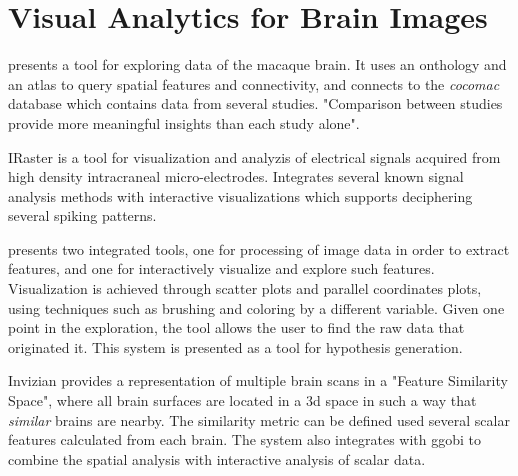 

\section{Visual Analytics for Brain Images}

\autocite{bezgin_matching_2009} presents a tool for exploring data of the macaque brain. It uses an onthology and an atlas to query spatial features and connectivity, and connects to the \emph{cocomac} database which contains data from several studies. "Comparison between studies provide more meaningful insights than each study alone".

IRaster \autocite{somerville_iraster:_2010}  is a tool for visualization and analyzis of electrical signals acquired from high density intracraneal micro-electrodes. Integrates several known signal analysis methods with interactive visualizations which supports deciphering several spiking patterns.

\autocite{steenwijk_integrated_2010} presents two integrated tools, one for processing of image data in order to extract features, and one for interactively visualize and explore such features. Visualization is achieved through scatter plots and parallel coordinates plots, using techniques such as brushing and coloring by a different variable.  Given one point in the exploration, the tool allows the user to find the raw data that originated it. This system is presented as a tool for hypothesis generation. 

Invizian \autocite{bowman_query-based_2011, bowman_visual_2012, van_horn_graphical_2013} provides a representation of multiple brain scans in a "Feature Similarity Space", where all brain surfaces are located in a 3d space in such a way that \emph{similar} brains are nearby. The similarity metric can be defined used several scalar features calculated from each brain. The system also integrates with ggobi to combine the spatial analysis with interactive analysis of scalar data.

\begin{table}
	\centering
		\begin{tabular}
			
		\end{tabular}
	\label{tab_related_brain_applications}
\end{table}